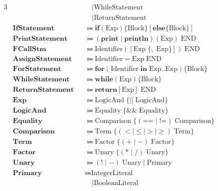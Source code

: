 \documentclass[a4paper,11pt]{article}
\begin{document}
\begin{alignat*}{3}
&                       &&\quad\mid  \text{WhileStatement} &&\\
&                       &&\quad\mid  \text{ReturnStatement} &&\\
&\textbf{IfStatement}     &&\Coloneqq  \textbf{if}(\text{Exp})\lbrace \text{Block}\rbrace [\textbf{else}\lbrace \text{Block}\rbrace] &&\\
&\textbf{PrintStatement}  &&\Coloneqq  (\textbf{print}\mid\textbf{println})(\text{Exp})\;\text{END} &&\\
&\textbf{FCallStm}        &&\Coloneqq  \text{Identifier}([\text{Exp}\;\lbrace,\;\text{Exp}\rbrace])\;\text{END} &&\\
&\textbf{AssignStatement} &&\Coloneqq  \text{Identifier} = \text{Exp}\;\text{END} &&\\
&\textbf{ForStatement}    &&\Coloneqq  \textbf{for}(\text{Identifier}\;\textbf{in}\;\text{Exp}..\text{Exp})\lbrace \text{Block}\rbrace &&\\
&\textbf{WhileStatement}  &&\Coloneqq  \textbf{while}(\text{Exp})\lbrace \text{Block}\rbrace &&\\
&\textbf{ReturnStatement} &&\Coloneqq  \textbf{return} [\text{Exp}]\;\text{END} &&\\
&\textbf{Exp}             &&\Coloneqq  \text{LogicAnd}\;\lbrace\text{||}\;\text{LogicAnd}\rbrace &&\\
&\textbf{LogicAnd}        &&\Coloneqq  \text{Equality}\;\lbrace\text{&&}\;\text{Equality}\rbrace &&\\
&\textbf{Equality}        &&\Coloneqq  \text{Comparison}\;\lbrace(\text{==}\mid\text{!=})\;\text{Comparison}\rbrace &&\\
&\textbf{Comparison}      &&\Coloneqq  \text{Term}\;\lbrace(<\mid\le\mid>\mid\ge)\;\text{Term}\rbrace &&\\
&\textbf{Term}            &&\Coloneqq  \text{Factor}\;\lbrace(+\mid-)\;\text{Factor}\rbrace &&\\
&\textbf{Factor}          &&\Coloneqq  \text{Unary}\;\lbrace(*\mid/)\;\text{Unary}\rbrace &&\\
&\textbf{Unary}           &&\Coloneqq  (!\mid-)\;\text{Unary} \mid \text{Primary} &&\\
&\textbf{Primary}         &&\Coloneqq  \text{IntegerLiteral} &&\\
&                       &&\quad\mid  \text{BooleanLiteral} &&\\

\end{alignat*}
\end{document}
